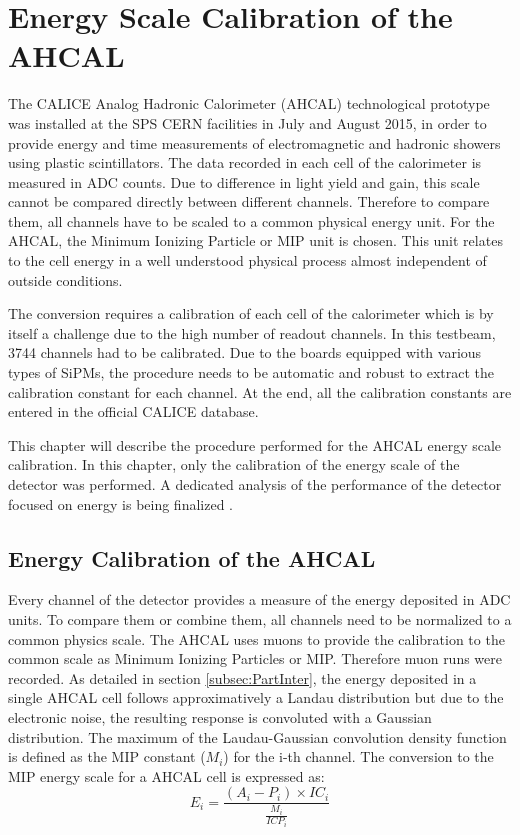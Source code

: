 \chapter{Energy Scale Calibration of the AHCAL}
\label{chap:ECalibAHCAL}

The CALICE Analog Hadronic Calorimeter (AHCAL) technological prototype was installed at the SPS CERN facilities in July and August 2015, in order to provide energy and time measurements of electromagnetic and hadronic showers using plastic scintillators. The data recorded in each cell of the calorimeter is measured in ADC counts. Due to difference in light yield and gain, this scale cannot be compared directly between different channels. Therefore to compare them, all channels have to be scaled to a common physical energy unit. For the AHCAL, the Minimum Ionizing Particle or MIP unit is chosen. This unit relates to the cell energy in a well understood physical process almost independent of outside conditions.

The conversion requires a calibration of each cell of the calorimeter which is by itself a challenge due to the high number of readout channels. In this testbeam, 3744 channels had to be calibrated. Due to the boards equipped with various types of SiPMs, the procedure needs to be automatic and robust to extract the calibration constant for each channel. At the end, all the calibration constants are entered in the official CALICE database.

This chapter will describe the procedure performed for the AHCAL energy scale calibration. In this chapter, only the calibration of the energy scale of the detector was performed. A dedicated analysis of the performance of the detector focused on energy is being finalized \cite{AmbraEnergy, AmbraTokyo}.

\section{Energy Calibration of the AHCAL}

Every channel of the detector provides a measure of the energy deposited in ADC units. To compare them or combine them, all channels need to be normalized to a common physics scale. The AHCAL uses muons to provide the calibration to the common scale as Minimum Ionizing Particles or MIP. Therefore muon runs were recorded. As detailed in section \ref{subsec:PartInter}, the energy deposited in a single AHCAL cell follows approximatively a Landau distribution but due to the electronic noise, the resulting response is convoluted with a Gaussian distribution. The maximum of the Laudau-Gaussian convolution density function is defined as the MIP constant ($M_{i}$) for the i-th channel. The conversion to the MIP energy scale for a AHCAL cell is expressed as:
\begin{equation}
	E_i = \frac{(A_i - P_i) \times IC_i }{\frac{M_{i}}{ICP_i}}
\end{equation}

